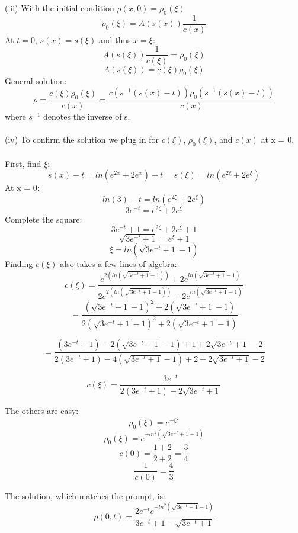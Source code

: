 \documentclass[letterpaper, 11pt]{article}
\begin{document}
(iii) 
With the initial condition $\rho(x, 0) = \rho_0(\xi)$
\[\rho_0(\xi) = A(s(x))\frac{1}{c(x)}\]
At $t=0$, $s(x) = s(\xi)$ and thus $x = \xi$:
\[A(s(\xi))\frac{1}{c(\xi)} = \rho_0(\xi)\]
\[A(s(\xi)) = c(\xi)\rho_0(\xi)\]
General solution:
\[\rho = \frac{c(\xi)\rho_0(\xi)}{c(x)} = \frac{c(s^{-1}(s(x)-t))\rho_0(s^{-1}(s(x)-t))}{c(x)}\] where $s^{-1}$ denotes the inverse of s.
\\\\
(iv)  To confirm the solution we plug in for $c(\xi)$, $\rho_0(\xi)$, and $c(x)$ at x = 0.   \\\\First, find $\xi$:
\[s(x)-t = ln(e^{2x} + 2e^x) - t = s(\xi) = ln(e^{2\xi} + 2e^{\xi})\]
At x = 0:
\[ln(3) -t = ln(e^{2\xi} + 2e^{\xi})\]
\[3e^{-t} = e^{2\xi} + 2e^{\xi}\]
Complete the square:
\[3e^{-t} + 1 = e^{2\xi} + 2e^{\xi} + 1\]
\[\sqrt{3e^{-t} + 1} = e^\xi + 1\]
\[\xi = ln(\sqrt{3e^{-t} + 1} -1)\]
Finding $c(\xi)$ also takes a few lines of algebra:
\[c(\xi) = \frac{e^{2(ln(\sqrt{3e^{-t} + 1} -1))} + 2e^{ln(\sqrt{3e^{-t} + 1} -1)}}   {2e^{2(ln(\sqrt{3e^{-t} + 1} -1))} + 2e^{ln(\sqrt{3e^{-t} + 1} -1)}}\]
\[ = \frac{(\sqrt{3e^{-t} + 1} -1)^2 + 2(\sqrt{3e^{-t} + 1} -1)}  {2(\sqrt{3e^{-t} + 1} -1)^2 + 2(\sqrt{3e^{-t} + 1} -1)}\]

\[= \frac{(3e^{-t} + 1) - 2(\sqrt{3e^{-t} + 1} -1) + 1 + 2\sqrt{3e^{-t} + 1} -2}  {2(3e^{-t} + 1) - 4(\sqrt{3e^{-t} + 1} -1) + 2 + 2\sqrt{3e^{-t} + 1} -2}\]

\[c(\xi) = \frac{3e^{-t}}{2(3e^{-t} + 1) - 2\sqrt{3e^{-t} + 1}}\]

The others are easy:
\[\rho_0(\xi) = e^{-\xi^2}\]
\[\rho_0(\xi) = e^{-ln^2(\sqrt{3e^{-t} + 1} -1)}\]
\[c(0) = \frac{1 + 2}{2+2} = \frac{3}{4}\]
\[\frac{1}{c(0)} = \frac{4}{3}\]

The solution, which matches the prompt, is:
\[\rho(0, t) = \frac{2e^{-t}e^{-ln^2(\sqrt{3e^{-t} + 1} -1)}}  {3e^{-t} + 1 - \sqrt{3e^{-t} + 1}}\]
\end{document}
